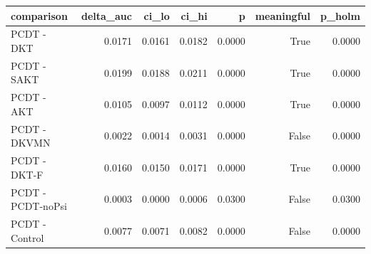 \begin{tabular}{lrrrrrr}
\toprule
comparison & delta\_auc & ci\_lo & ci\_hi & p & meaningful & p\_holm \\
\midrule
PCDT - DKT & 0.0171 & 0.0161 & 0.0182 & 0.0000 & True & 0.0000 \\
PCDT - SAKT & 0.0199 & 0.0188 & 0.0211 & 0.0000 & True & 0.0000 \\
PCDT - AKT & 0.0105 & 0.0097 & 0.0112 & 0.0000 & True & 0.0000 \\
PCDT - DKVMN & 0.0022 & 0.0014 & 0.0031 & 0.0000 & False & 0.0000 \\
PCDT - DKT-F & 0.0160 & 0.0150 & 0.0171 & 0.0000 & True & 0.0000 \\
PCDT - PCDT-noPsi & 0.0003 & 0.0000 & 0.0006 & 0.0300 & False & 0.0300 \\
PCDT - Control & 0.0077 & 0.0071 & 0.0082 & 0.0000 & False & 0.0000 \\
\bottomrule
\end{tabular}
